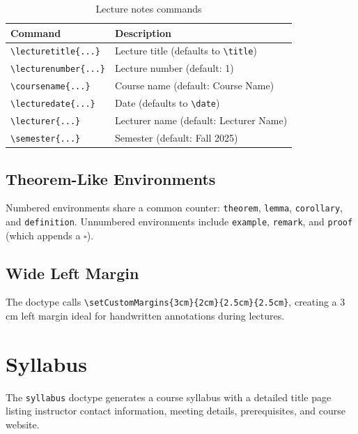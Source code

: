 \begin{table}[htbp]
    \centering
    \caption{Lecture notes commands}
    \label{tab:lecture-commands}
    \begin{tabular}{@{} l p{7.5cm} @{}}
        \toprule
        \textbf{Command} & \textbf{Description} \\
        \midrule
        \texttt{\textbackslash lecturetitle\{...\}} & Lecture title (defaults to \texttt{\textbackslash title}) \\
        \texttt{\textbackslash lecturenumber\{...\}} & Lecture number (default: 1) \\
        \texttt{\textbackslash coursename\{...\}} & Course name (default: Course Name) \\
        \texttt{\textbackslash lecturedate\{...\}} & Date (defaults to \texttt{\textbackslash date}) \\
        \texttt{\textbackslash lecturer\{...\}} & Lecturer name (default: Lecturer Name) \\
        \texttt{\textbackslash semester\{...\}} & Semester (default: Fall 2025) \\
        \bottomrule
    \end{tabular}
\end{table}

\subsection{Theorem-Like Environments}

Numbered environments share a common counter:
\texttt{theorem}, \texttt{lemma}, \texttt{corollary}, and
\texttt{definition}.  Unnumbered environments include \texttt{example},
\texttt{remark}, and \texttt{proof} (which appends a $\square$).

\subsection{Wide Left Margin}

The doctype calls \texttt{\textbackslash setCustomMargins\{3cm\}\{2cm\}\{2.5cm\}\{2.5cm\}},
creating a 3\,cm left margin ideal for handwritten annotations during
lectures.

\section{Syllabus}
\label{sec:syllabus}

The \texttt{syllabus} doctype generates a course syllabus with a detailed
title page listing instructor contact information, meeting details,
prerequisites, and course website.

